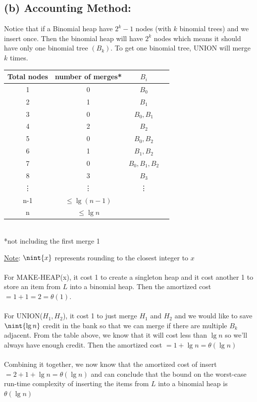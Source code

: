 \documentclass{article}
\begin{document}
\subsection*{(b) Accounting Method:}
Notice that if a Binomial heap have $2^{k}-1$ nodes (with $k$ binomial trees) and we insert once. Then the binomial heap will have $2^k$ nodes which means it should have only one binomial tree $(B_k)$. To get one binomial tree, UNION will merge $k$ times.\\
\begin{center}
\begin{tabular}{||c c c c||} 
 \hline
 Total nodes & number of merges* & $B_i$ & \\ [0.5ex] 
 \hline\hline
 1 & 0 & $B_0$ & \\ 
 \hline
 2 & 1 & $B_1$ & \\
 \hline
 3 & 0 & $B_0, B_1$ & \\
 \hline
 4 & 2 & $B_2$ & \\
 \hline
 5 & 0 & $B_0, B_2$ & \\ [1ex] 
 \hline
 6 & 1 & $B_1, B_2$ & \\ [1ex] 
 \hline
 7 & 0 & $B_0, B_1, B_2$ & \\ [1ex] 
 \hline
 8 & 3 & $B_3$ & \\ [1ex] 
 \hline
 \vdots & \vdots & \vdots & \\ [1ex] 
 \hline
 n-1 & $\leq\lg (n-1)$ &  & \\ [1ex] 
 \hline
 n & $\leq\lg n$ &  & \\ [1ex] 
 \hline
\end{tabular}\\
*not including the first merge \textcircled{1}
\end{center}

\noindent\underline{Note}: $\nint{x}$ represents rounding to the closest integer to $x$ \\~\\
For MAKE-HEAP(x), it cost 1 to create a singleton heap and it cost another 1 to store an item from $L$ into a binomial heap. Then the amortized cost $= 1 + 1 = 2 = \theta(1)$.\\~\\
For UNION($H_1, H_2$), it cost 1 to just merge $H_1$ and $H_2$ and we would like to save $\nint{\lg n}$ credit in the bank so that we can merge if there are multiple $B_k$ adjacent. From the table above, we know that it will cost less than $\lg n$ so we'll always have enough credit. Then the amortized cost $ = 1 + \lg n = \theta(\lg n)$\\~\\
Combining it together, we now know that the amortized cost of insert $= 2 + 1 + \lg n = \theta(\lg n)$ and can conclude that the bound on the worst-case run-time complexity of inserting the items from $L$ into a binomial heap is $\theta(\lg n)$
\end{document}
